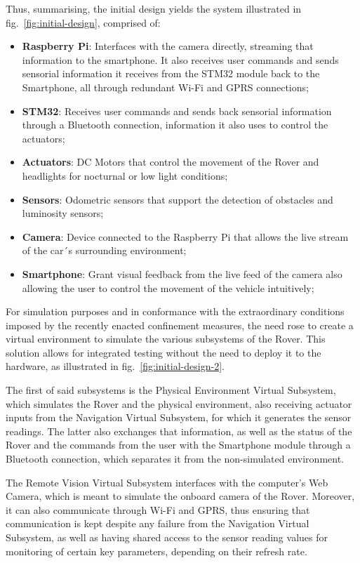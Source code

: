 Thus, summarising, the initial design yields the system illustrated in
fig.~\ref{fig:initial-design}, comprised of:

\begin{itemize}
\item \textbf{ Raspberry Pi}: Interfaces with the camera directly, streaming that information to the smartphone. It also receives user commands and sends sensorial information it receives from the STM32 module back to the Smartphone, all through redundant Wi-Fi and GPRS connections;
\item \textbf{STM32}: Receives user commands and sends back sensorial information through a Bluetooth connection, information it also uses to control the actuators;
\item \textbf{Actuators}: DC Motors that control the movement of the Rover and headlights for nocturnal or low light conditions;
\item \textbf{Sensors}: Odometric sensors that support the detection of obstacles and luminosity sensors;
\item \textbf{Camera}: Device connected to the Raspberry Pi that allows the live stream of the car´s surrounding environment;
\item \textbf{Smartphone}: Grant visual feedback from the live feed of the camera also allowing the user to control the movement of the vehicle intuitively;
\end{itemize}

For simulation purposes and in conformance with the extraordinary conditions imposed by the recently enacted confinement measures, the need rose to create a virtual environment to simulate the various subsystems of the Rover. This solution allows for integrated testing without the need to deploy it to the hardware, as illustrated in fig.~\ref{fig:initial-design-2}.

The first of said subsystems is the Physical Environment Virtual Subsystem, which simulates the Rover and the physical environment, also receiving actuator inputs from the Navigation Virtual Subsystem, for which it generates the sensor readings. The latter also exchanges that information, as well as the status of the Rover and the commands from the user with the Smartphone module through a Bluetooth connection, which separates it from the non-simulated environment.

The Remote Vision Virtual Subsystem interfaces with the computer's Web Camera, which is meant to simulate the onboard camera of the Rover. Moreover, it can also communicate through Wi-Fi and GPRS, thus ensuring that communication is kept despite any failure from the Navigation Virtual Subsystem, as well as having shared access to the sensor reading values for monitoring of certain key parameters, depending on their refresh rate.

